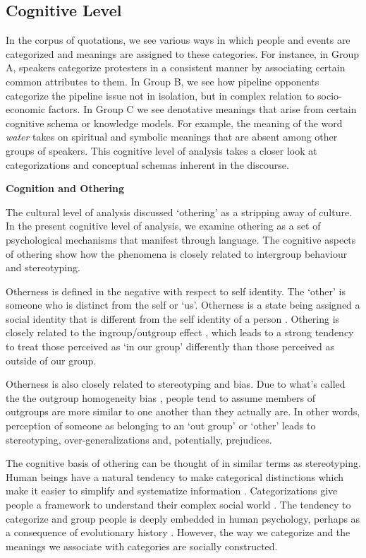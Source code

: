 \subsection{Cognitive Level}

In the corpus of quotations, we see various ways in which people and events are categorized and meanings are assigned to these categories. For instance, in Group A, speakers categorize protesters in a consistent manner by associating certain common attributes to them. In Group B, we see how pipeline opponents categorize the pipeline issue not in isolation, but in complex relation to socio-economic factors. In Group C we see denotative meanings that arise from certain cognitive schema or knowledge models. For example, the meaning of the word \textit{water} takes on spiritual and symbolic meanings that are absent among other groups of speakers. This cognitive level of analysis takes a closer look at categorizations and conceptual schemas inherent in the discourse. 

\textbf{Cognition and Othering}

The cultural level of analysis discussed `othering' as a stripping away of culture. In the present cognitive level of analysis, we examine othering as a set of psychological mechanisms that manifest through language. The cognitive aspects of othering show how the phenomena is closely related to intergroup behaviour and stereotyping. 

Otherness is defined in the negative with respect to self identity. The `other' is someone who is distinct from the self or `us'. Otherness is a state being assigned a social identity that is different from the self identity of a person \citep{Miller2008}. Othering is closely related to the ingroup/outgroup effect \citep{Billig1973}, which leads to a strong tendency to treat those perceived as `in our group' differently than those perceived as outside of our group. 

Otherness is also closely related to stereotyping and bias. Due to what's called the the outgroup homogeneity bias \citep{Haslam1996}, people tend to assume members of outgroups are more similar to one another than they actually are. In other words, perception of someone as belonging to an `out group' or `other' leads to stereotyping, over-generalizations and, potentially, prejudices. 

The cognitive basis of othering can be thought of in similar terms as stereotyping. Human beings have a natural tendency to make categorical distinctions which make it easier to simplify and systematize information \citep{Tajfel2001}. Categorizations give people a framework to understand their complex social world \citep{McGarty2002}. The tendency to categorize and group people is deeply embedded in human psychology, perhaps as a consequence of evolutionary history \citep{Wilson2019}. However, the way we categorize and the meanings we associate with categories are socially constructed. 

